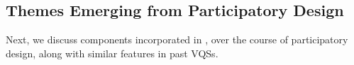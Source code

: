 \subsection{Themes Emerging from Participatory Design\label{sec:pd_findings}}
Next, we discuss components 
incorporated in \zvpp, over the course of participatory design, 
along with similar features in past VQSs.

